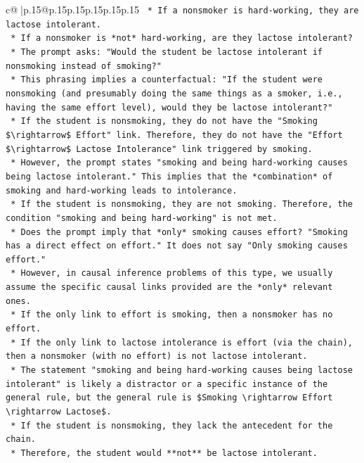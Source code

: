 \documentclass{article}
\begin{document}
{\begin{supertabular}{c@{$\;$}|p{.15\linewidth}@{}p{.15\linewidth}p{.15\linewidth}p{.15\linewidth}p{.15\linewidth}p{.15\linewidth}}
{{{\texttt{    *   If a nonsmoker is hard{-}working, they are lactose intolerant.} \\
\texttt{    *   If a nonsmoker is *not* hard{-}working, are they lactose intolerant?} \\
\texttt{    *   The prompt asks: "Would the student be lactose intolerant if nonsmoking instead of smoking?"} \\
\texttt{    *   This phrasing implies a counterfactual: "If the student were nonsmoking (and presumably doing the same things as a smoker, i.e., having the same effort level), would they be lactose intolerant?"} \\
\texttt{    *   If the student is nonsmoking, they do not have the "Smoking \$\textbackslash{}rightarrow\$ Effort" link. Therefore, they do not have the "Effort \$\textbackslash{}rightarrow\$ Lactose Intolerance" link triggered by smoking.} \\
\texttt{    *   However, the prompt states "smoking and being hard{-}working causes being lactose intolerant." This implies that the *combination* of smoking and hard{-}working leads to intolerance.} \\
\texttt{    *   If the student is nonsmoking, they are not smoking. Therefore, the condition "smoking and being hard{-}working" is not met.} \\
\texttt{    *   Does the prompt imply that *only* smoking causes effort? "Smoking has a direct effect on effort." It does not say "Only smoking causes effort."} \\
\texttt{    *   However, in causal inference problems of this type, we usually assume the specific causal links provided are the *only* relevant ones.} \\
\texttt{    *   If the only link to effort is smoking, then a nonsmoker has no effort.} \\
\texttt{    *   If the only link to lactose intolerance is effort (via the chain), then a nonsmoker (with no effort) is not lactose intolerant.} \\
\texttt{    *   The statement "smoking and being hard{-}working causes being lactose intolerant" is likely a distractor or a specific instance of the general rule, but the general rule is \$Smoking \textbackslash{}rightarrow Effort \textbackslash{}rightarrow Lactose\$.} \\
\texttt{    *   If the student is nonsmoking, they lack the antecedent for the chain.} \\
\texttt{    *   Therefore, the student would **not** be lactose intolerant.} \\
}}}
\end{supertabular}}
\end{document}
